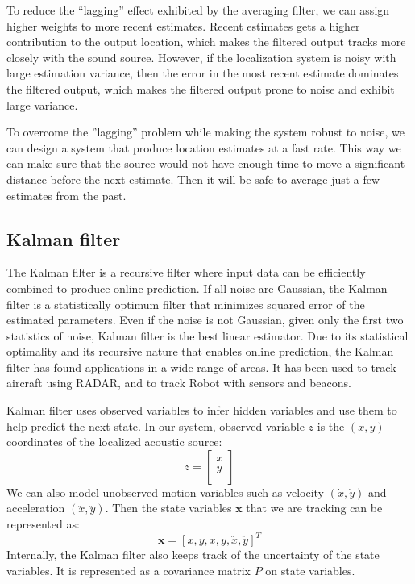 To reduce the ``lagging'' effect exhibited by the averaging filter, we can assign higher weights to more recent estimates. Recent estimates gets a higher contribution to the output location, which makes the filtered output tracks more closely with the sound source. However, if the localization system is noisy with large estimation variance, then the error in the most recent estimate dominates the filtered output, which makes the filtered output prone to noise and exhibit large variance.

To overcome the ''lagging'' problem while making the system robust to noise, we can design a system that produce location estimates at a fast rate. This way we can make sure that the source would not have enough time to move a significant distance before the next estimate. Then it will be safe to average just a few estimates from the past.

\subsection{Kalman filter}
The Kalman filter is a recursive filter where input data can be efficiently combined to produce online prediction. If all noise are Gaussian, the Kalman filter is a statistically optimum filter that minimizes squared error of the estimated parameters\cite{kalman:1, kalman:3}. Even if the noise is not Gaussian, given only the first two statistics of noise, Kalman filter is the best linear estimator\cite{kalman:2}. Due to its statistical optimality and its recursive nature that enables online prediction, the Kalman filter has found applications in a wide range of areas. It has been used to track aircraft using RADAR, and to track Robot with sensors and beacons\cite{kalman:4}.

Kalman filter uses observed variables to infer hidden variables and use them to help predict the next state. In our system, observed variable $z$ is the $(x,y)$ coordinates of the localized acoustic source:
\[
z = \left[\begin{array}{c}
x\\
y\\
\end{array}\right]
\]
We can also model unobserved motion variables such as velocity $(\dot{x}, \dot{y})$ and acceleration $(\ddot{x}, \ddot{y})$. Then the state variables $\mathbf{x}$ that we are tracking can be represented as:
\[
\mathbf{x} = \left[x, y, \dot{x}, \dot{y}, \ddot{x}, \ddot{y}\right]^T
\]
Internally, the Kalman filter also keeps track of the uncertainty of the state variables. It is represented as a covariance matrix $P$ on state variables.

